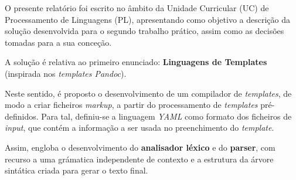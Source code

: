 \documentclass[../relatorio.tex]{subfiles}
\begin{document}
O presente relatório foi escrito no âmbito da Unidade Curricular (UC) de Processamento de Linguagens (PL), apresentando 
como objetivo a descrição da solução desenvolvida para o segundo trabalho prático, assim como as decisões 
tomadas para a sua conceção.

A solução é relativa ao primeiro enunciado: \textbf{Linguagens de Templates} 
(inspirada nos \textit{templates Pandoc}).

Neste sentido, é proposto o desenvolvimento de um compilador de \textit{templates},
de modo a criar ficheiros \textit{markup}, a partir do processamento de
\textit{templates} pré-definidos. 
Para tal, definiu-se a linguagem \textit{YAML} como formato dos ficheiros de \textit{input}, 
que contém a informação a ser usada no preenchimento do \textit{template}.

Assim, engloba o desenvolvimento do \textbf{analisador léxico} e do \textbf{parser}, 
com recurso a uma grámatica independente de contexto e a estrutura da árvore sintática criada
para gerar o texto final. 
\end{document}
